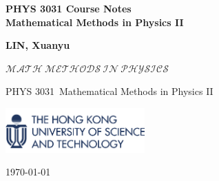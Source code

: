 \documentclass[10pt]{article}
\newcommand\course{PHYS 3031}
\begin{document}
	

\begin{titlepage}
	\begin{center}
		\vspace*{3cm}
		
		\Huge
		\hrulefill
		\vspace{1cm}
		
		\huge
		\textbf{PHYS 3031 Course Notes\\}
		\vspace{1cm}
		\textbf{Mathematical Methods in Physics II}
		\vspace{1cm}
		
		\hrulefill
		
		\vspace{1.5cm}
		\Large

		\textbf{LIN, Xuanyu}
		
		\vfill
		
		$\mathscr{MATH\ METHODS\ IN\ PHYSICS}$
		
		\vspace{1cm}
		
		\course \ Mathematical Methods in Physics II
		
		\vspace{1cm}
		
		\includegraphics[width=0.4\textwidth]{logo-hkust.png}
		\\
		
		\Large
		
		\today
		
	\end{center}
\end{titlepage}

\end{document}

